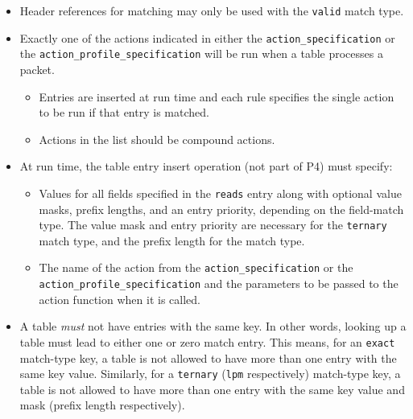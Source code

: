 \documentclass[12pt]{article}
\begin{document}
\begin{itemize}
\item
Header references for matching may only be used with the \texttt{valid} match type.
\item
Exactly one of the actions indicated in either the
\texttt{action_specification} or the \texttt{action_profile_specification}
will be run when a table processes a packet.

\begin{itemize}
\item
Entries are inserted at run time and each rule specifies the single action 
to be run if that entry is matched.
\item
Actions in the list should be compound actions.
\end{itemize}

\item
At run time, the table entry insert operation (not part of P4) must specify:

\begin{itemize}
\item
Values for all fields specified in the \texttt{reads} entry along with optional 
value masks, prefix lengths, and an entry priority, depending on the field-match type.
The value mask and entry priority are necessary for the \texttt{ternary} match type, and 
the prefix length for the  match type.
\item
The name of the action from the \texttt{action_specification} or the
\texttt{action_profile_specification} and the parameters to be passed to the
action function when it is called.
\end{itemize}

\item
A table \textit{must} not have entries with the same key. In other words, looking up a table
must lead to either one or zero match entry. This means, for an \texttt{exact} 
match-type key, a table is not allowed to have more than one entry with the same key value.
Similarly, for a \texttt{ternary} (\texttt{lpm} respectively) match-type key, a table is 
not allowed to have more than one entry with the same key value and mask (prefix length respectively).


\end{itemize}
\end{document}
